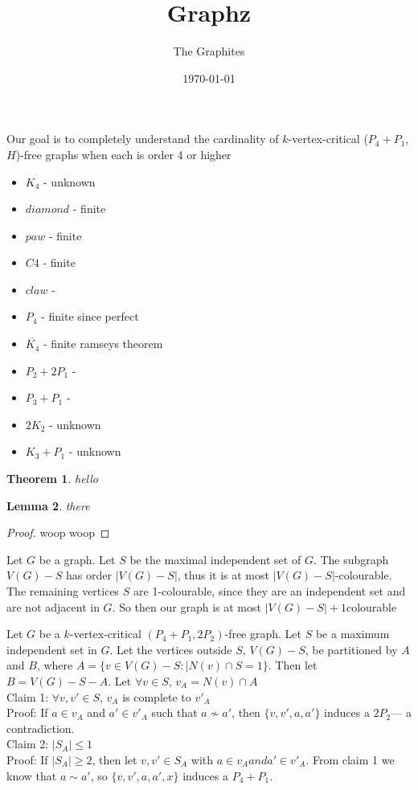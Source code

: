 \documentclass[12pt]{article}
\title{Graphz}
\author{The Graphites}
\date{\today}
\newtheorem{theorem}{Theorem}[section]
\newtheorem{lemma}[theorem]{Lemma}
\begin{document}
\maketitle
Our goal is to completely understand the cardinality of $k$-vertex-critical ($P_4 + P_1$,$H$)-free graphs when each is order 4 or higher
\begin{itemize}
\item $K_4$ - unknown
\item $diamond$ - finite ~\cite{abuadas2022vertexcritical}
\item $paw$ - finite ~\cite{abuadas2022vertexcritical}
\item $C4$ - finite ~\cite{p6c4free}
\item $claw$ - ~\cite{clawfree}
\item $P_4$ - finite since perfect
\item $\overline{K_4}$ - finite ramseys theorem
\item $P_2 + 2P_1$ - ~\cite{dichotomizing}
\item $P_3 + P_1$ - ~\cite{dichotomizing}
\item $2K_2$ - unknown
\item $K_3 + P_1$ - unknown
\end{itemize}
\begin{theorem}
hello
\end{theorem}
\begin{lemma}
there
\end{lemma}
\begin{proof}
woop woop
\end{proof}
Let $G$ be a graph. Let $S$ be the maximal independent set of $G$. The subgraph $V(G) - S$ has order $|V(G) - S|$, thus it is at most $|V(G) - S|$-colourable. The remaining vertices $S$ are 1-colourable, since they are an independent set and are not adjacent in $G$. So then our graph is at most $|V(G) - S| + 1$colourable

Let $G$ be a $k$-vertex-critical $(P_4 + P_1, 2P_2)$-free graph. Let $S$ be a maximum independent set in $G$. Let the vertices outside $S$, $V(G) - S$, be partitioned by $A$ and $B$, where $A = \{v \in V(G) - S : |N(v) \cap S = 1\}$. Then let $B = V(G) - S - A$.
Let $\forall v \in S$, $v_A = N(v) \cap A$\\
Claim 1: $\forall v,v' \in S$, $v_A$ is complete to $v'_A$\\
Proof: If $a \in v_A$ and $a' \in v'_A$ such that $a \not \sim a'$, then $\{v, v', a, a'\}$ induces a $2P_2$--- a contradiction.\\
Claim 2: $|S_A| \leq 1$\\
Proof: If $|S_A| \geq 2$, then let $v, v' \in S_A$ with $a\in v_A and a' \in v'_A$. From claim 1 we know that $a \sim a'$, so $\{v, v', a, a', x\}$ induces a $P_4 + P_1$.
\end{document}
